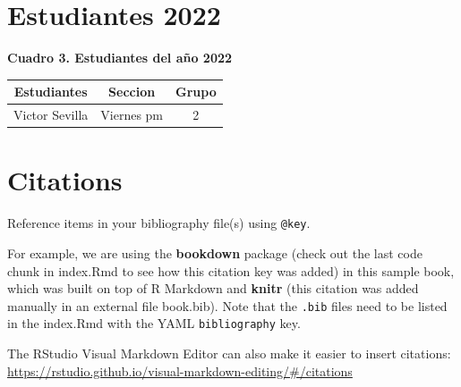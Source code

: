 \documentclass[
]{book}
\begin{document}
\hypertarget{estudiantes-2022}{%
\section{Estudiantes 2022}\label{estudiantes-2022}}

\textbf{Cuadro 3. Estudiantes del año 2022}

\begin{longtable}[]{@{}ccc@{}}
\toprule
Estudiantes & Seccion & Grupo \\
\midrule
\endhead
Victor Sevilla & Viernes pm & 2 \\
\bottomrule
\end{longtable}

\hypertarget{citations}{%
\section{Citations}\label{citations}}

Reference items in your bibliography file(s) using \texttt{@key}.

For example, we are using the \textbf{bookdown} package \citep{R-bookdown} (check out the last code chunk in index.Rmd to see how this citation key was added) in this sample book, which was built on top of R Markdown and \textbf{knitr} \citep{xie2015} (this citation was added manually in an external file book.bib).
Note that the \texttt{.bib} files need to be listed in the index.Rmd with the YAML \texttt{bibliography} key.

The RStudio Visual Markdown Editor can also make it easier to insert citations: \url{https://rstudio.github.io/visual-markdown-editing/\#/citations}

  
\end{document}
